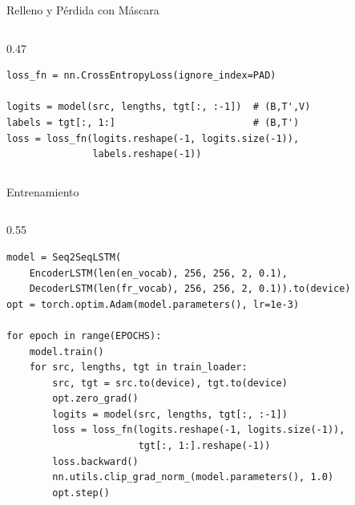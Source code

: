 \documentclass[aspectratio=169, 10pt]{beamer}
\begin{document}
\begin{frame}[fragile]{Relleno y P\'erdida con M\'ascara}
\begin{columns}[T]
\begin{column}{0.47\textwidth}
			\begin{tcolorbox}[codebox]
\scriptsize
\begin{verbatim}
loss_fn = nn.CrossEntropyLoss(ignore_index=PAD)

logits = model(src, lengths, tgt[:, :-1])  # (B,T',V)
labels = tgt[:, 1:]                        # (B,T')
loss = loss_fn(logits.reshape(-1, logits.size(-1)),
               labels.reshape(-1))
\end{verbatim}
			\end{tcolorbox}
		\end{column}
	\end{columns}

\end{frame}

\begin{frame}[fragile]{Entrenamiento}

	\begin{columns}[T]
		\begin{column}{0.55\textwidth}
			\begin{tcolorbox}[codebox]
\scriptsize
\begin{verbatim}
model = Seq2SeqLSTM(
    EncoderLSTM(len(en_vocab), 256, 256, 2, 0.1),
    DecoderLSTM(len(fr_vocab), 256, 256, 2, 0.1)).to(device)
opt = torch.optim.Adam(model.parameters(), lr=1e-3)

for epoch in range(EPOCHS):
    model.train()
    for src, lengths, tgt in train_loader:
        src, tgt = src.to(device), tgt.to(device)
        opt.zero_grad()
        logits = model(src, lengths, tgt[:, :-1])
        loss = loss_fn(logits.reshape(-1, logits.size(-1)),
                       tgt[:, 1:].reshape(-1))
        loss.backward()
        nn.utils.clip_grad_norm_(model.parameters(), 1.0)
        opt.step()
\end{verbatim}
			\end{tcolorbox}
		\end{column}


\end{columns}
\end{frame}
\end{document}
